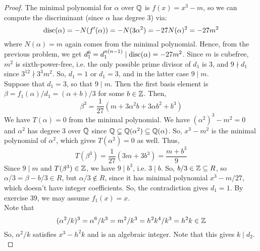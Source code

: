 \begin{proof} 
    The minimal polynomial for $\alpha$ over $\mathbb{Q}$ is $f(x) = x^3-m$, so we can compute the discriminant (since $\alpha$ has degree 3) via:
    \[ \operatorname{disc}(\alpha) = -N(f'(\alpha)) = -N(3\alpha^2) = -27N(\alpha)^2 = -27m^2 \]
    where $N(\alpha) = m$ again comes from the minimal polynomial. Hence, from the previous problem, we get $d_1^6 = d_1^{n(n-1)} \mid \operatorname{disc}(\alpha) = -27m^2$. Since $m$ is cubefree, $m^2$ is sixth-power-free, i.e. the only possible prime divisor of $d_1$ is 3, and $9 \nmid d_1$ since $3^{12} \nmid 3^3m^2$. So, $d_1=1$ or $d_1=3$, and in the latter case $9 \mid m$. \\

    Suppose that $d_1 = 3$, so that $9 \mid m$. Then the first basis element is $\beta = f_1(\alpha)/d_1 = (\alpha+b)/3$ for some $b \in \mathbb{Z}$. Then,
    \[ \beta^3 = \frac{1}{27}(m+3\alpha^2b+3\alpha b^2 + b^3) \]
    We have $T(\alpha) = 0$ from the minimal polynomial. We have $(\alpha^2)^3 - m^2 = 0$ and $\alpha^2$ has degree 3 over $\mathbb{Q}$ since $\mathbb{Q} \subsetneq \mathbb{Q}(\alpha^2) \subseteq \mathbb{Q}(\alpha)$. So, $x^3-m^2$ is the minimal polynomial of $\alpha^2$, which gives $T(\alpha^2) = 0$ as well. Thus,
    \[ T(\beta^3) = \frac{1}{27}(3m+3b^3) = \frac{m+b^3}{9} \]
    Since $9 \mid m$ and $T(\beta^3) \in \mathbb{Z}$, we have $9 \mid b^3$, i.e. $3 \mid b$. So, $b/3 \in \mathbb{Z} \subseteq R$, so $\alpha/3 = \beta - b/3 \in R$, but $\alpha/3 \notin R$, since it has minimal polynomial $x^3 - m/27$, which doesn't have integer coefficients. So, the contradiction gives $d_1 = 1$. By exercise 39, we may assume $f_1(x) = x$. \\

    Note that
    \[ (\alpha^2/k)^3 = \alpha^6/k^3 = m^2/k^3 = h^2k^4/k^3 = h^2k \in \mathbb{Z} \]
    So, $\alpha^2/k$ satisfies $x^3-h^2k$ and is an algebraic integer. Note that this gives $k \mid d_2$. \\


\end{proof}
